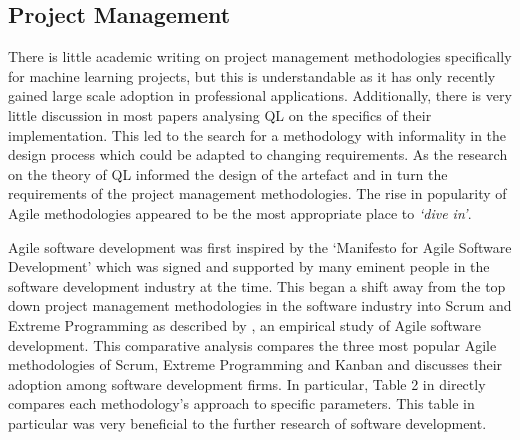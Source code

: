 \documentclass[hidelinks,journal]{IEEEtran}
\begin{document}
\subsection{Project Management}
\label{subsec:lrProjMan}
There is little academic writing on project management methodologies specifically for machine learning projects, but this is understandable as it has only recently gained large scale adoption in professional applications. Additionally, there is very little discussion in most papers analysing QL on the specifics of their implementation. This led to the search for a methodology with informality in the design process which could be adapted to changing requirements. As the research on the theory of QL informed the design of the artefact and in turn the requirements of the project management methodologies. The rise in popularity of Agile methodologies appeared to be the most appropriate place to \textit{‘dive in’}.

Agile software development was first inspired by the ‘Manifesto for Agile Software Development’ \textcite{Beck01} which was signed and supported by many eminent people in the software development industry at the time. This began a shift away from the top down project management methodologies in the software industry into Scrum and Extreme Programming as described by \textcite{Matharu15}, an empirical study of Agile software development. This comparative analysis compares the three most popular Agile methodologies of Scrum, Extreme Programming and Kanban and discusses their adoption among software development firms. In particular, Table 2 in \textcite[p. 4]{Matharu15} directly compares each methodology’s approach to specific parameters. This table in particular was very beneficial to the further research of software development.
\end{document}
